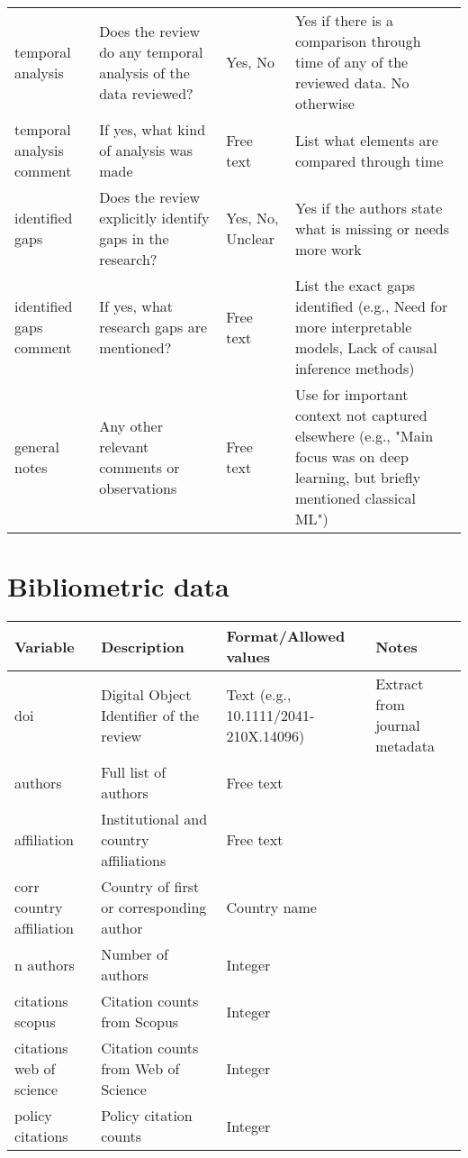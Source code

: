 \documentclass{article}
\begin{document}
\begin{longtable}{p{1.5cm}p{3cm}p{3cm}p{3cm}}
        temporal analysis & Does the review do any temporal analysis of the data reviewed? & Yes, No & Yes if there is a comparison through time of any of the reviewed data. No otherwise\\
        temporal analysis comment & If yes, what kind of analysis was made & Free text & List what elements are compared through time\\
        identified gaps & Does the review explicitly identify gaps in the research? & Yes, No, Unclear & Yes if the authors state what is missing or needs more work\\
        identified gaps comment & If yes, what research gaps are mentioned? & Free text & List the exact gaps identified (e.g., Need for more interpretable models, Lack of causal inference methods)\\
        general notes & Any other relevant comments or observations & Free text & Use for important context not captured elsewhere (e.g., "Main focus was on deep learning, but briefly mentioned classical ML")\\
         \hline
    \end{longtable}

\section{Bibliometric data}
\begin{longtable}{p{1.5cm}p{3cm}p{3cm}p{3cm}}
        \hline
         \textbf{Variable} & \textbf{Description} & \textbf{Format/Allowed values} & \textbf{Notes}\\
         \hline
         doi & Digital Object Identifier of the review & Text (e.g., 10.1111/2041-210X.14096) & Extract from journal metadata\\
         authors & Full list of authors & Free text & \\
         affiliation & Institutional and country affiliations & Free text & \\
         corr country affiliation & Country of first or corresponding author & Country name & \\
         n authors & Number of authors & Integer & \\
         citations scopus & Citation counts from Scopus & Integer & \\
         citations web of science & Citation counts from Web of Science & Integer & \\
         policy citations & Policy citation counts & Integer & \\

\end{longtable}
\end{document}
